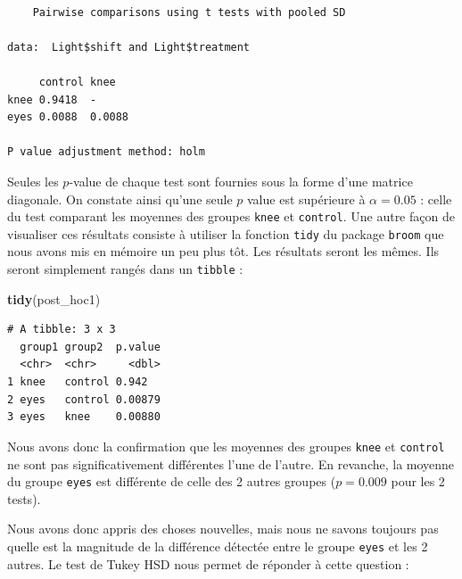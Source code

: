 \documentclass[a4paperpaper,]{article}
\newenvironment{Shaded}{\begin{snugshade}}{\end{snugshade}}
\newcommand{\CommentTok}[1]{\textcolor[rgb]{0.54,0.53,0.53}{#1}}
\newcommand{\KeywordTok}[1]{\textcolor[rgb]{0.12,0.11,0.11}{\textbf{#1}}}
\newcommand{\NormalTok}[1]{\textcolor[rgb]{0.12,0.11,0.11}{#1}}
\newcommand{\OperatorTok}[1]{\textcolor[rgb]{0.12,0.11,0.11}{#1}}
\newcommand{\StringTok}[1]{\textcolor[rgb]{0.75,0.01,0.01}{#1}}
\begin{document}
\begin{Shaded}
\end{Shaded}

\begin{verbatim}

    Pairwise comparisons using t tests with pooled SD 

data:  Light$shift and Light$treatment 

     control knee  
knee 0.9418  -     
eyes 0.0088  0.0088

P value adjustment method: holm 
\end{verbatim}

Seules les \(p\)-value de chaque test sont fournies sous la forme d'une matrice diagonale. On constate ainsi qu'une seule \(p\) value est supérieure à \(\alpha = 0.05\) : celle du test comparant les moyennes des groupes \texttt{knee} et \texttt{control}. Une autre façon de visualiser ces résultats consiste à utiliser la fonction \texttt{tidy} du package \texttt{broom} que nous avons mis en mémoire un peu plus tôt. Les résultats seront les mêmes. Ils seront simplement rangés dans un \texttt{tibble} :

\begin{Shaded}
\begin{Highlighting}[]
\KeywordTok{tidy}\NormalTok{(post_hoc1)}
\end{Highlighting}
\end{Shaded}

\begin{verbatim}
# A tibble: 3 x 3
  group1 group2  p.value
  <chr>  <chr>     <dbl>
1 knee   control 0.942  
2 eyes   control 0.00879
3 eyes   knee    0.00880
\end{verbatim}

Nous avons donc la confirmation que les moyennes des groupes \texttt{knee} et \texttt{control} ne sont pas significativement différentes l'une de l'autre. En revanche, la moyenne du groupe \texttt{eyes} est différente de celle des 2 autres groupes (\(p = 0.009\) pour les 2 tests).

Nous avons donc appris des choses nouvelles, mais nous ne savons toujours pas quelle est la magnitude de la différence détectée entre le groupe \texttt{eyes} et les 2 autres. Le test de Tukey HSD nous permet de réponder à cette question :
\end{document}

